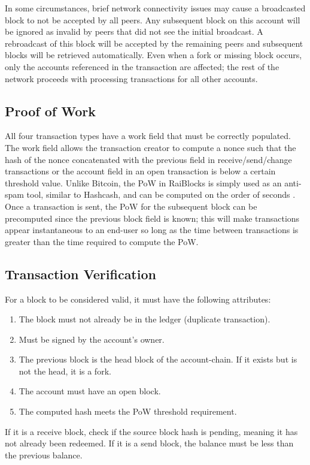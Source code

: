 In some circumstances, brief network connectivity issues may cause a broadcasted block to not be accepted by all peers. Any subsequent block on this account will be ignored as invalid by peers that did not see the initial broadcast. A rebroadcast of this block will be accepted by the remaining peers and subsequent blocks will be retrieved automatically. Even when a fork or missing block occurs, only the accounts referenced in the transaction are affected; the rest of the network proceeds with processing transactions for all other accounts.

\subsection{Proof of Work} \label{sec:pow}
All four transaction types have a work field that must be correctly populated. The work field allows the transaction creator to compute a nonce such that the hash of the nonce concatenated with the previous field in receive/send/change transactions or the account field in an open transaction is below a certain threshold value. Unlike Bitcoin, the PoW in RaiBlocks is simply used as an anti-spam tool, similar to Hashcash, and can be computed on the order of seconds \cite{Back_hashcash}. Once a transaction is sent, the PoW for the subsequent block can be precomputed since the previous block field is known; this will make transactions appear instantaneous to an end-user so long as the time between transactions is greater than the time required to compute the PoW.

\subsection{Transaction Verification} \label{sec:transaction_verification}
For a block to be considered valid, it must have the following attributes:
\begin{enumerate}
   \item The block must not already be in the ledger (duplicate transaction).
   \item Must be signed by the account's owner.
   \item The previous block is the head block of the account-chain. If it exists but is not the head, it is a fork.
   \item The account must have an open block.
   \item The computed hash meets the PoW threshold requirement.
\end{enumerate}
If it is a receive block, check if the source block hash is pending, meaning it has not already been redeemed. If it is a send block, the balance must be less than the previous balance.